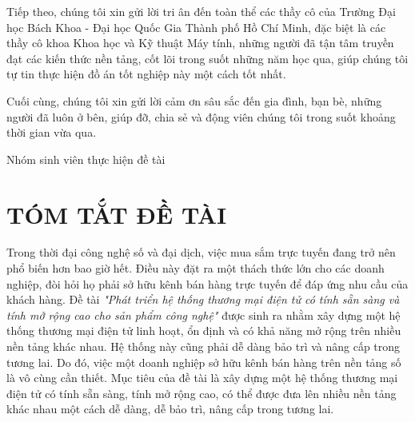 \noindent Tiếp theo, chúng tôi xin gửi lời tri ân đến toàn thể các thầy cô của Trường Đại học Bách Khoa - Đại học Quốc Gia Thành phố Hồ Chí Minh, đặc biệt là các thầy cô khoa Khoa học và Kỹ thuật Máy tính, những người đã tận tâm truyền đạt các kiến thức nền tảng, cốt lõi trong suốt những năm học qua, giúp chúng tôi tự tin thực hiện đồ án tốt nghiệp này một cách tốt nhất.\vspace{0.5cm}

\noindent Cuối cùng, chúng tôi xin gửi lời cảm ơn sâu sắc đến gia đình, bạn bè, những người đã luôn ở bên, giúp đỡ, chia sẻ và động viên chúng tôi trong suốt khoảng thời gian vừa qua.\vspace{0.5cm}

\begin{flushright}
Nhóm sinh viên thực hiện đề tài
\end{flushright}

\newpage
\section*{\Huge TÓM TẮT ĐỀ TÀI}
\noindent Trong thời đại công nghệ số và đại dịch, việc mua sắm trực tuyến đang trở nên phổ biến hơn bao giờ hết. Điều này đặt ra một thách thức lớn cho các doanh nghiệp, đòi hỏi họ phải sở hữu kênh bán hàng trực tuyến để đáp ứng nhu cầu của khách hàng. Đề tài \textit{"Phát triển hệ thống thương mại điện tử có tính sẵn sàng và tính mở rộng cao cho sản phẩm công nghệ"} được sinh ra nhằm xây dựng một hệ thống thương mại điện tử linh hoạt, ổn định và có khả năng mở rộng trên nhiều nền tảng khác nhau. Hệ thống này cũng phải dễ dàng bảo trì và nâng cấp trong tương lai. Do đó, việc một doanh nghiệp sở hữu kênh bán hàng trên nền tảng số là vô cùng cần thiết. Mục tiêu của đề tài là xây dựng một hệ thống thương mại điện tử có tính sẵn sàng, tính mở rộng cao, có thể được đưa lên nhiều nền tảng khác nhau một cách dễ dàng, dễ bảo trì, nâng cấp trong tương lai.